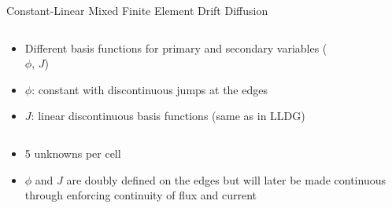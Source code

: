 \documentclass[10pt]{beamer}
\begin{document}
\begin{frame}{Constant-Linear Mixed Finite Element Drift Diffusion}

	\begin{columns}
	\begin{column}{.5\textwidth}

		\begin{itemize}

			\item Different basis functions for primary and secondary variables ($\phi$, $J$)

			\item $\phi$: constant with discontinuous jumps at the edges 

			\item $J$: linear discontinuous basis functions (same as in LLDG) 

		\end{itemize}
		
	\end{column}
	\begin{column}{.5\textwidth}

		\begin{figure}

			\def\svgwidth{\textwidth}
			

		\end{figure}

	\end{column}

	\end{columns}

	\begin{columns}
	\begin{column}{1.06\textwidth}

		\begin{itemize}

			\item 5 unknowns per cell 

			\item $\phi$ and $J$ are doubly defined on the edges but will later be made continuous through enforcing continuity of flux and current 

		\end{itemize}

	\end{column}
	\end{columns}

\end{frame}
\end{document}
